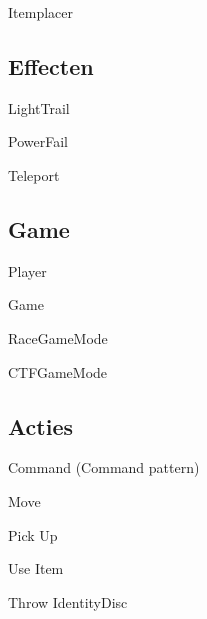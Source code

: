 \documentclass[11pt,t]{beamer}
\begin{document}
\begin{frame}{Itemplacer}
\end{frame}

\subsection{Effecten}

\begin{frame}{LightTrail}
\end{frame}

\begin{frame}{PowerFail}
\end{frame}

\begin{frame}{Teleport}
\end{frame}

\subsection{Game}

\begin{frame}{Player}
\end{frame}

\begin{frame}{Game}
\end{frame}

\begin{frame}{RaceGameMode}
\end{frame}

\begin{frame}{CTFGameMode}
\end{frame}

\subsection{Acties}

\begin{frame}{Command (Command pattern)}
\end{frame}

\begin{frame}{Move}
\end{frame}

\begin{frame}{Pick Up}
\end{frame}

\begin{frame}{Use Item}
\end{frame}

\begin{frame}{Throw IdentityDisc}
\end{frame}
\end{document}
